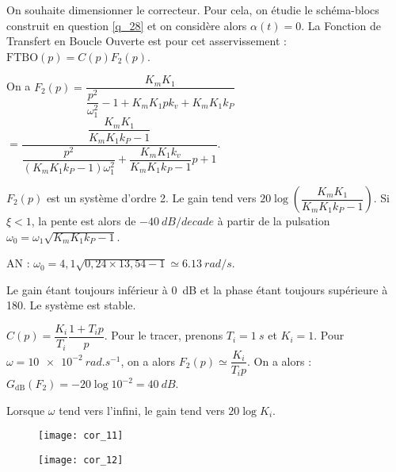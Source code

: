 On souhaite dimensionner le correcteur. Pour cela, on étudie le schéma-blocs construit en question \ref{q_28} et on considère alors $\alpha(t)=0$. La Fonction de Transfert en Boucle Ouverte est pour cet asservissement : $\text{FTBO}(p)=C(p)F_2(p)$.

\ifprof
\begin{corrige}
On a $F_2(p)= \dfrac{K_m K_1}{\dfrac{p^2}{\omega_1^2}-1+K_m K_1pk_v+K_m K_1k_P}$
$ = \dfrac{\dfrac{K_m K_1}{K_m K_1k_P-1}}{\dfrac{p^2}{\left(K_m K_1k_P-1\right)\omega_1^2}+\dfrac{K_m K_1k_v}{K_m K_1k_P-1}p+1}$.

$F_2(p)$ est un système d'ordre 2. 
Le gain tend vers $20\log \left(\dfrac{K_m K_1}{K_m K_1k_P-1}\right)$. Si $\xi<1$, la pente est alors 
de $-\SI{40}{dB/decade}$ à partir de la pulsation $\omega_0 = \omega_1\sqrt{K_m K_1k_P-1}$.

AN : $\omega_0 = 4,1\sqrt{0,24 \times 13,54-1} \simeq \SI{6,13}{rad/s}$.


\end{corrige}
\else
\fi


\ifprof
\begin{corrige}
Le gain étant toujours inférieur à \SI{0}{dB} et la phase étant toujours supérieure à 180\degres. Le système est stable.
\end{corrige}
\else
\fi


\ifprof
\begin{corrige}
 $C(p)=\dfrac{K_i}{T_i} \dfrac{1+T_i p}{ p} $.  
 Pour le tracer, prenons $T_i=\SI{1}{s}$ et $K_i = 1$. Pour $\omega=\SI{10e-2}{rad.s^{-1}}$, on a alors  $F_2(p) \simeq \dfrac{K_i}{T_i p}$. On a alors : 
 $G_{\text{dB}}(F_2) = -20 \log 10^{-2} = \SI{40}{dB} $.
 

 Lorsque $\omega$ tend vers l'infini, le gain tend vers $20\log K_i$.


\begin{figure}[H]
\centering
\texttt{[image: cor\_11]}
\end{figure}


\begin{figure}[H]
\centering
\texttt{[image: cor\_12]}
\end{figure}
 
\end{corrige}
\else
\fi

